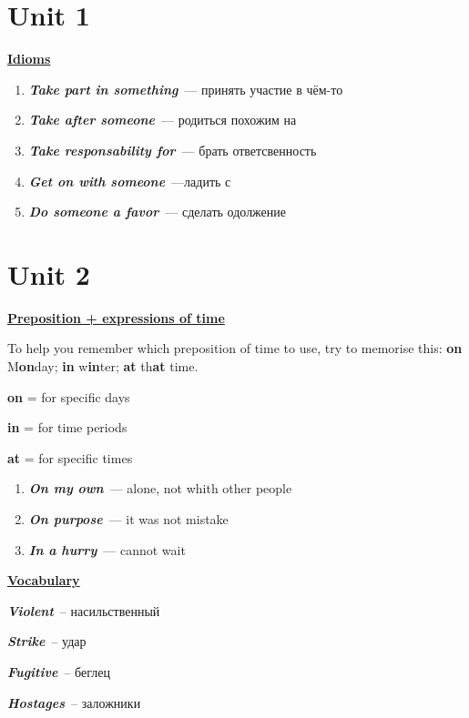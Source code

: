 \documentclass[10pt,a4paper]{article}
\begin{document}
\twocolumn[]


\section{Unit 1}
\textbf{\underline{Idioms}}

\begin{enumerate}
  \item \textit{\textbf{Take part in something}}~--- принять участие в чём-то
  \item \textit{\textbf{Take after someone}}~--- родиться похожим на
  \item \textit{\textbf{Take responsability for}}~--- брать ответсвенность
  \item \textit{\textbf{Get on with someone}}~---ладить с
  \item \textit{\textbf{Do someone a favor}}~--- сделать одолжение
\end{enumerate}




\section{Unit 2}

\textbf{\underline{Preposition + expressions of time}}

To help you remember which preposition of time to use, try to memorise this: \textbf{on} M\textbf{on}day; \textbf{in} w\textbf{in}ter; \textbf{at} th\textbf{at} time. 

\textbf{on} = for specific days

\textbf{in} = for time periods

\textbf{at} = for specific times

\begin{enumerate}
  \item \textit{\textbf{On my own}}~--- alone, not whith other people
  \item \textit{\textbf{On purpose}}~--- it was not mistake
  \item \textit{\textbf{In a hurry}}~--- cannot wait
\end{enumerate}

\textbf{\underline{Vocabulary}}

\textit{\textbf{Violent}}~-- насильственный

\textit{\textbf{Strike}}~-- удар

\textit{\textbf{Fugitive}}~-- беглец

\textit{\textbf{Hostages}}~-- заложники
\end{document}
